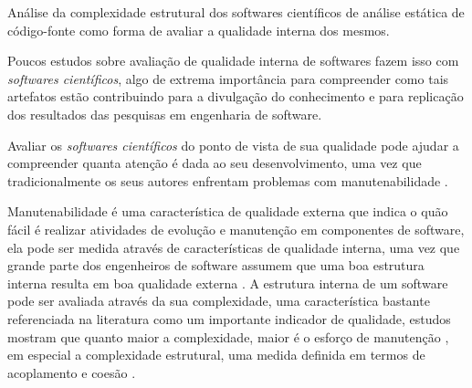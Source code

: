 Análise da complexidade estrutural dos softwares científicos de análise
estática de código-fonte como forma de avaliar a qualidade interna dos mesmos.

\label{complexidade-ferramentas}

% 


Poucos estudos sobre avaliação de qualidade interna de softwares fazem isso com
{\it softwares científicos}, algo de extrema importância para compreender como
tais artefatos estão contribuindo para a divulgação do conhecimento e para
replicação dos resultados das pesquisas em engenharia de software.

Avaliar os {\it softwares científicos} do ponto de vista de sua qualidade pode
ajudar a compreender quanta atenção é dada ao seu desenvolvimento, uma vez que
tradicionalmente os seus autores enfrentam problemas com manutenabilidade
\cite{Prlic2012}.

Manutenabilidade é uma característica de qualidade externa que indica o quão
fácil é realizar atividades de evolução e manutenção em componentes de
software, ela pode ser medida através de características de qualidade interna,
uma vez que grande parte dos engenheiros de software assumem que uma boa
estrutura interna resulta em boa qualidade externa \cite{Fenton2014}. A
estrutura interna de um software pode ser avaliada através da sua complexidade,
uma característica bastante referenciada na literatura como um importante
indicador de qualidade, estudos mostram que quanto maior a complexidade, maior
é o esforço de manutenção \cite{hashim1996software, Darcy2005}, em especial a
complexidade estrutural, uma medida definida em termos de acoplamento e coesão
\cite{Terceiro2012}.

